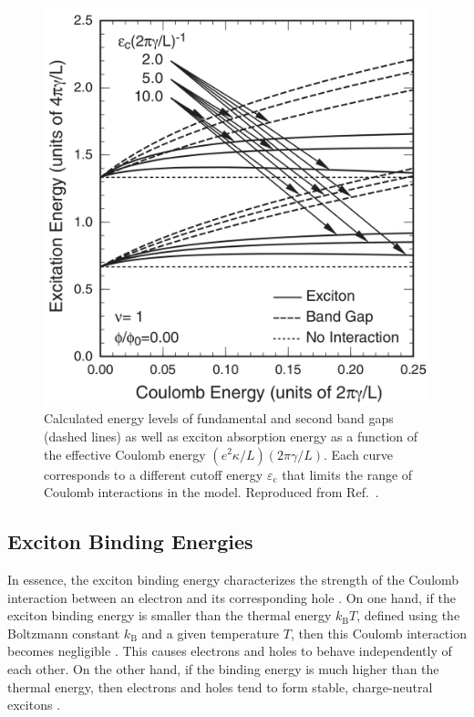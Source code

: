 \begin{figure}[ht]
	\centering
	\includegraphics[scale=0.25]{images/chapter_optical_props/coulomb_shift_ando}
	\caption{Calculated energy levels of fundamental and second band gaps (dashed lines) as well as exciton absorption energy as a function of the effective Coulomb energy $(e^2 \kappa / L) (2 \pi \gamma / L)$. Each curve corresponds to a different cutoff energy $\varepsilon_\text{c}$ that limits the range of Coulomb interactions in the model. Reproduced from Ref.\ \cite{ando2005theory}.}
	\label{fig:coulomb_shift}
\end{figure}

\clearpage

\subsection{Exciton Binding Energies}

In essence, the exciton binding energy characterizes the strength of the Coulomb interaction between an electron and its corresponding hole \cite{valkunas2006exciton}. On one hand, if the exciton binding energy is smaller than the thermal energy $k_\text{B} T$, defined using the Boltzmann constant $k_\text{B}$ and a given temperature $T$, then this Coulomb interaction becomes negligible \cite{valkunas2006exciton}. This causes electrons and holes to behave independently of each other. On the other hand, if the binding energy is much higher than the thermal energy, then electrons and holes tend to form stable, charge-neutral excitons \cite{valkunas2006exciton}.


